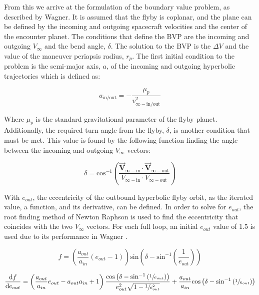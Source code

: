 \documentclass[letterpaper, preprint, paper,11pt]{AAS}	%
\begin{document}
From this we arrive at the formulation of the boundary value problem, as described by Wagner\cite{Wagner2015}. It is assumed that the flyby is coplanar, and the plane can be defined by the incoming and outgoing spacecraft velocities and the center of the encounter planet. The conditions that define the BVP are the incoming and outgoing $V_\infty$ and the bend angle, $\delta$. The solution to the BVP is the $\Delta V$ and the value of the maneuver periapsis radius, $r_p$. The first initial condition to the problem is the semi-major axis, $a$, of the incoming and outgoing hyperbolic trajectories which is defined as:

\begin{equation}
    a_\text{in/out} = -\frac{\mu_p}{v^2_{\infty-\text{in/out}}}
\end{equation}

Where $\mu_p$ is the standard gravitational parameter of the flyby planet. Additionally, the required turn angle from the flyby, $\delta$, is another condition that must be met. This value is found by the following function finding the angle between the incoming and outgoing $V_\infty$ vectors:

\begin{equation}
    \delta = \text{cos}^{-1}\left(\frac{ \vec{\textbf{V}}_{\infty-\text{in}} \cdot \vec{\textbf{V}}_{\infty-\text{out}} }{ V_{\infty-\text{in}} \cdot V_{\infty-\text{out}} }\right)
\end{equation}

With $e_{out}$, the eccentricity of the outbound hyperbolic flyby orbit, as the iterated value, a function, and its derivative, can be defined. In order to solve for $e_{out}$, the root finding method of Newton Raphson is used to find the eccentricity that coincides with the two $V_\infty$ vectors. For each full loop, an initial $e_{out}$ value of 1.5 is used due to its performance in Wagner \cite{Wagner2015}.

\begin{equation}
    f = \left( \frac{a_{out}}{a_{in}} (e_{out} - 1) \right) \text{sin} \left( \delta - \text{sin}^{-1} \left( \frac{1}{e_{out}} \right) \right)
\end{equation}

\begin{equation}
    \frac{\text{d}f}{\text{d}e_{out}} = \left( \frac{a_{out}}{a_{in}}e_{out} - a_{out}{a_{in}} + 1 \right) \frac{ \text{cos}\left( \delta - \text{sin}^{-1} \left( \sfrac{1}{e_{out}} \right) \right) }{ e_{out}^{2} \sqrt{1 - \sfrac{1}{e_{out}^{2}} } } + \frac{a_{out}}{a_{in}}\text{cos}\left( \delta - \text{sin}^{-1} \left( \sfrac{1}{e_{out}} \right) \right)
\end{equation}
\end{document}
